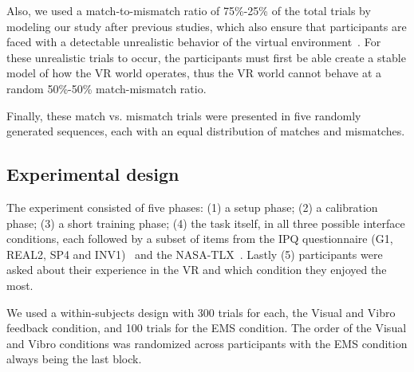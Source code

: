 Also, we used a match-to-mismatch ratio of 75\%-25\% of the total trials by modeling our study after previous studies, which also ensure that participants are faced with a detectable unrealistic behavior of the virtual environment~\cite{Liao2011,Wiersema2007,Donchin1988}. For these unrealistic trials to occur, the participants must first be able create a stable model of how the VR world operates, thus the VR world cannot behave at a random 50\%-50\% match-mismatch ratio.

Finally, these match vs. mismatch trials were presented in five randomly generated sequences, each with an equal distribution of matches and mismatches.

\subsection{Experimental design}
The experiment consisted of five phases: (1) a setup phase; (2) a calibration phase; (3) a short training phase; (4) the task itself, in all three possible interface conditions, each followed by a subset of items from the IPQ questionnaire (G1, REAL2, SP4 and INV1)~\cite{T.W.Schubert2003} and the NASA-TLX~\cite{Hart1988}. Lastly (5) participants were asked about their experience in the VR and which condition they enjoyed the most.


We used a within-subjects design with 300 trials for each, the Visual and Vibro feedback condition, and 100 trials for the EMS condition. The order of the Visual and Vibro conditions was randomized across participants with the EMS condition always being the last block. 






